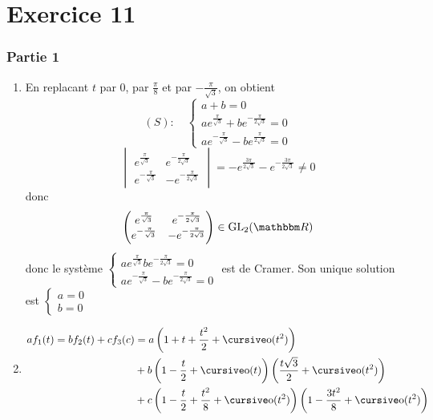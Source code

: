 \part{Exercice 11}
\section*{Partie 1}

\begin{enumerate}
	\item En replacant $t$ par $0$, par  $\frac{\pi}{8}$ et par $-\frac{\pi}{\sqrt{3}}$, on obtient \[
				(S): \quad \begin{cases}
					a+b =0\\
					ae^{\frac{\pi}{\sqrt{3}}} + be^{-\frac{\pi}{2\sqrt{3}}} = 0\\
					ae^{-\frac{\pi}{\sqrt{3}}} - be^{\frac{\pi}{2\sqrt{3}}} = 0
				\end{cases}
		\]
		\[
			\begin{vmatrix}
				e^{\frac{\pi}{\sqrt{3}}}&e^{-\frac{\pi}{2\sqrt{3}}}\\
				e^{-\frac{\pi}{\sqrt{3}}}&-e^{-\frac{\pi}{2\sqrt{3}}}
			\end{vmatrix}
			= -e^{\frac{3\pi}{2\sqrt{3}}} - e^{-\frac{3\pi}{2\sqrt{3}}} \neq 0
		\] donc \[
			\begin{pmatrix}
				e^{\frac{\pi}{\sqrt{3}}}&e^{-\frac{\pi}{2\sqrt{3}}}\\
				e^{-\frac{\pi}{\sqrt{3}}}&-e^{-\frac{\pi}{2\sqrt{3}}} 
			\end{pmatrix}  \in  \mathrm{GL}_2(\R)
		\]  donc le système $\begin{cases}
			ae^{\frac{\pi}{\sqrt{3}}}be^{-\frac{\pi}{2\sqrt{3}}} = 0\\
			ae^{-\frac{\pi}{\sqrt{3}}}-be^{-\frac{\pi}{2\sqrt{3}}} = 0
		\end{cases}$ est de Cramer. Son unique solution est $\begin{cases}
			a = 0\\
			b= 0
		\end{cases}$
	\item 
		\begin{align*}
			af_1(t) = bf_2(t) + cf_3(c) &= a \left( 1+t+\frac{t^2}{2}+\po(t^2) \right)\\
																	& + b\left( 1-\frac{t}{2}+\po(t) \right) \left( \frac{t\sqrt{3}}{2} + \po(t^2) \right) \\ 
																	& + c\left( 1-\frac{t}{2}+\frac{t^2}{8} + \po(t^2) \right) \left( 1-\frac{3t^2}{8} + \po(t^2) \right) \\

\end{align*}
\end{enumerate}
